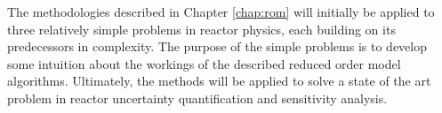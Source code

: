The methodologies described in Chapter \ref{chap:rom} will initially be applied to three relatively simple problems in reactor physics, each building on its predecessors in complexity. The purpose of the simple problems is to develop some intuition about the workings of the described reduced order model algorithms. Ultimately, the methods will be applied to solve a state of the art problem in reactor uncertainty quantification and sensitivity analysis.







